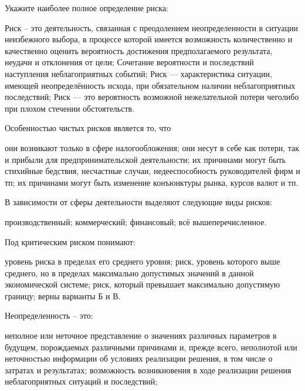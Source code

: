 \documentclass[12pt, table, twoside, a4paper]{exam}
\begin{document}
\begin{questions}
\begin{multicols}{2}
\setlength{\columnsep}{1cm}

\question Укажите наиболее полное определение риска:
	 \begin{choices}
	 \CC Риск – это деятельность, связанная с преодолением неопределенности в ситуации неизбежного выбора, в процессе которой имеется возможность количественно и качественно оценить вероятность достижения предполагаемого результата, неудачи и отклонения от цели;
	 \choice Сочетание вероятности и последствий наступления неблагоприятных событий;
	 \choice Риск — характеристика ситуации, имеющей неопределённость исхода, при обязательном наличии неблагоприятных последствий;
	 \choice Риск — это вероятность возможной нежелательной потери чеголибо при плохом стечении обстоятельств.
	 \end{choices}
\question Особенностью чистых рисков является то, что
	 \begin{choices}
	 \choice они возникают только в сфере налогообложения;
	 \choice они несут в себе как потери, так и прибыли для предпринимательской деятельности;
	 \CC их причинами могут быть стихийные бедствия, несчастные случаи, недееспособность руководителей фирм и тп;
	 \choice их причинами могут быть изменение конъюнктуры рынка, курсов валют и тп.
	 \end{choices}
\question В зависимости от сферы деятельности выделяют следующие виды рисков:
	 \begin{choices}
	 \choice производственный;
	 \choice коммерческий;
	 \choice финансовый;
	 \CC всё вышеперечисленное.
	 \end{choices}
\question Под критическим риском понимают:
	 \begin{choices}
	 \choice уровень риска в пределах его среднего уровня;
	 \CC риск, уровень которого выше среднего, но в пределах максимально допустимых значений в данной экономической системе;
	 \choice риск, который превышает максимально допустимую границу;
	 \choice верны варианты Б и В.
	 \end{choices}
\question Неопределенность – это:
	 \begin{choices}
	 \CC неполное или неточное представление о значениях различных параметров в будущем, порождаемых различными причинами и, прежде всего, неполнотой или неточностью информации об условиях реализации решения, в том числе о затратах и результатах;
	 \choice возможность возникновения в ходе реализации решения неблагоприятных ситуаций и последствий;

\end{choices}
\end{multicols}
\end{questions}
\end{document}
